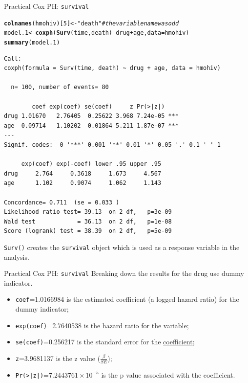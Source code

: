 \documentclass[12pt,english,pdf,xcolor=dvipsnames,aspectratio=169,handout]{beamer}\usepackage[]{graphicx}\usepackage[]{xcolor}
\makeatletter
\newcommand{\hlnum}[1]{\textcolor[rgb]{0.686,0.059,0.569}{#1}}%
\newcommand{\hlstr}[1]{\textcolor[rgb]{0.192,0.494,0.8}{#1}}%
\newcommand{\hlcom}[1]{\textcolor[rgb]{0.678,0.584,0.686}{\textit{#1}}}%
\newcommand{\hlopt}[1]{\textcolor[rgb]{0,0,0}{#1}}%
\newcommand{\hlstd}[1]{\textcolor[rgb]{0.345,0.345,0.345}{#1}}%
\newcommand{\hlkwb}[1]{\textcolor[rgb]{0.69,0.353,0.396}{#1}}%
\newcommand{\hlkwc}[1]{\textcolor[rgb]{0.333,0.667,0.333}{#1}}%
\newcommand{\hlkwd}[1]{\textcolor[rgb]{0.737,0.353,0.396}{\textbf{#1}}}%
\newenvironment{kframe}{%
 \def\at@end@of@kframe{}%
 \ifinner\ifhmode%
  \def\at@end@of@kframe{\end{minipage}}%
  \begin{minipage}{\columnwidth}%
 \fi\fi%
 \def\FrameCommand##1{\hskip\@totalleftmargin \hskip-\fboxsep
 \colorbox{shadecolor}{##1}\hskip-\fboxsep
     \hskip-\linewidth \hskip-\@totalleftmargin \hskip\columnwidth}%
 \MakeFramed {\advance\hsize-\width
   \@totalleftmargin\z@ \linewidth\hsize
   \@setminipage}}%
 {\par\unskip\endMakeFramed%
 \at@end@of@kframe}
\newenvironment{knitrout}{}{} %
\makeatother
\begin{document}
\begin{frame}[fragile]{Practical Cox PH: \texttt{survival}}
\begin{knitrout}\tiny
{}\color{fgcolor}\begin{kframe}
\begin{alltt}
\hlkwd{colnames}\hlstd{(hmohiv)[}\hlnum{5}\hlstd{]} \hlkwb{<-} \hlstr{"death"} \hlcom{# the variable name was odd}
\hlstd{model.1} \hlkwb{<-} \hlkwd{coxph}\hlstd{(}\hlkwd{Surv}\hlstd{(time, death)} \hlopt{~} \hlstd{drug} \hlopt{+} \hlstd{age,} \hlkwc{data} \hlstd{= hmohiv)}
\hlkwd{summary}\hlstd{(model.1)}
\end{alltt}
\begin{verbatim}
Call:
coxph(formula = Surv(time, death) ~ drug + age, data = hmohiv)

  n= 100, number of events= 80 

        coef exp(coef) se(coef)     z Pr(>|z|)    
drug 1.01670   2.76405  0.25622 3.968 7.24e-05 ***
age  0.09714   1.10202  0.01864 5.211 1.87e-07 ***
---
Signif. codes:  0 '***' 0.001 '**' 0.01 '*' 0.05 '.' 0.1 ' ' 1

     exp(coef) exp(-coef) lower .95 upper .95
drug     2.764     0.3618     1.673     4.567
age      1.102     0.9074     1.062     1.143

Concordance= 0.711  (se = 0.033 )
Likelihood ratio test= 39.13  on 2 df,   p=3e-09
Wald test            = 36.13  on 2 df,   p=1e-08
Score (logrank) test = 38.39  on 2 df,   p=5e-09
\end{verbatim}
\end{kframe}
\end{knitrout}

\texttt{Surv()} creates the \texttt{survival} object which is used as a response variable in the analysis.
\end{frame}



\begin{frame}[fragile]{Practical Cox PH: \texttt{survival}}
Breaking down the results for the drug use dummy indicator.\bigskip

\begin{itemize}
\item \texttt{coef}=1.0166984 is the estimated coefficient (a logged hazard ratio) for the dummy indicator;
\item \texttt{exp(coef)}=2.7640538 is the hazard ratio for the variable;
\item \texttt{se(coef)}=0.256217 is the standard error for the \underline{coefficient};
\item \texttt{z}=3.9681137 is the z value ($\frac{\beta}{SE}$);
\item \texttt{Pr(>|z|)}=\ensuremath{7.2443761\times 10^{-5}} is the p value associated with the coefficient.
\end{itemize}

\end{frame}
\end{document}
